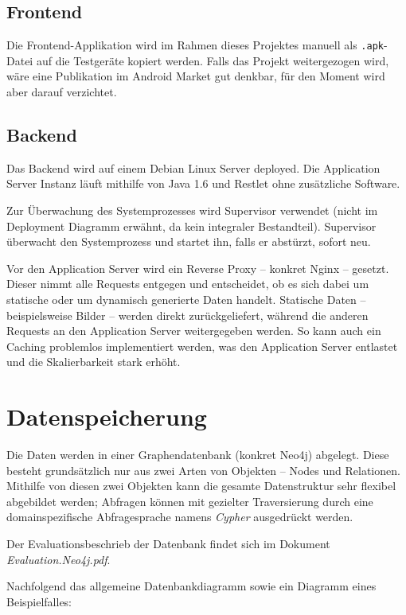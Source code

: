 \documentclass[10pt,a4paper]{scrartcl}
\begin{document}
\subsection{Frontend}

Die Frontend-Applikation wird im Rahmen dieses Projektes manuell als \texttt{.apk}-Datei auf die
Testgeräte kopiert werden. Falls das Projekt weitergezogen wird, wäre eine Publikation im Android
Market gut denkbar, für den Moment wird aber darauf verzichtet.


\subsection{Backend}

Das Backend wird auf einem Debian Linux Server deployed. Die Application Server Instanz läuft
mithilfe von Java 1.6 und Restlet ohne zusätzliche Software.

Zur Überwachung des Systemprozesses
wird Supervisor verwendet (nicht im Deployment Diagramm erwähnt, da kein integraler Bestandteil).
Supervisor überwacht den Systemprozess und startet ihn, falls er abstürzt, sofort neu. 

Vor den Application Server wird ein Reverse Proxy -- konkret Nginx -- gesetzt. Dieser nimmt alle
Requests entgegen und entscheidet, ob es sich dabei um statische oder um dynamisch generierte Daten
handelt. Statische Daten -- beispielsweise Bilder -- werden direkt zurückgeliefert, während
die anderen Requests an den Application Server weitergegeben werden. So kann auch ein Caching
problemlos implementiert werden, was den Application Server entlastet und die Skalierbarkeit stark
erhöht.


\section{Datenspeicherung}

Die Daten werden in einer Graphendatenbank (konkret Neo4j) abgelegt. Diese besteht grundsätzlich nur
aus zwei Arten von Objekten -- Nodes und Relationen. Mithilfe von diesen zwei Objekten kann die
gesamte Datenstruktur sehr flexibel abgebildet werden; Abfragen können mit gezielter Traversierung
durch eine domainspezifische Abfragesprache namens \textit{Cypher} ausgedrückt werden.

Der Evaluationsbeschrieb der Datenbank findet sich im Dokument \textit{Evaluation.Neo4j.pdf}.

Nachfolgend das allgemeine Datenbankdiagramm sowie ein Diagramm eines Beispielfalles:
\end{document}
